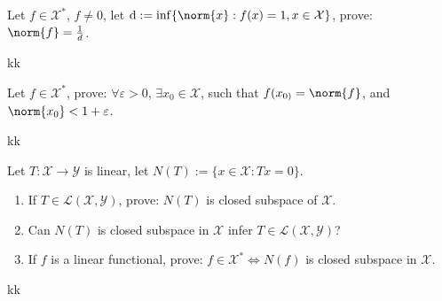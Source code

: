 \documentclass{ctexart}
\newif\ifpreface
\begin{document}
\large
\setlength{\baselineskip}{1.2em}
\ifpreface
    
\else
\maketitle
\fi
{}
\begin{problem}
  Let \(f \in \mathcal{X}^*\), \(f \neq 0\), let \(\mathrm{d}:= \inf\{\norm{x}: f(x)=1, x \in \mathcal{X}\}\),
  prove: \(\norm{f}=\frac{1}{d}\).
\end{problem}
\begin{solution}
  kk
\end{solution}

\begin{problem}
  Let \(f \in \mathcal{X}^*\), prove: \(\forall \varepsilon >0\), \(\exists x_0 \in \mathcal{X}\), such that 
  \(f(x_{0)} = \norm{f}\), and \(\norm{x_{0}}< 1+ \varepsilon\).
\end{problem}

\begin{solution}
  kk
\end{solution}

\begin{problem}
  Let \(T:\mathcal{X} \to \mathcal{Y}\) is linear, let \(N(T):=\{x \in \mathcal{X}: Tx = 0\}\).
  \begin{enumerate}
    \item If \(T \in \mathscr{L}(\mathcal{X},\mathcal{Y})\), prove: \(N(T)\)
      is closed subspace of \(\mathcal{X}\).
    \item Can \(N(T)\) is closed subspace in \(\mathcal{X}\) infer \(T \in \mathscr{L}(\mathcal{X},\mathcal{Y})\)?
    \item If \(f \) is a linear functional, prove: \(f \in \mathcal{X}^* \iff N(f)\) is closed subspace in \(\mathcal{X}\).
      
  \end{enumerate}
\end{problem}
\begin{solution}
  kk
\end{solution}
\end{document}
